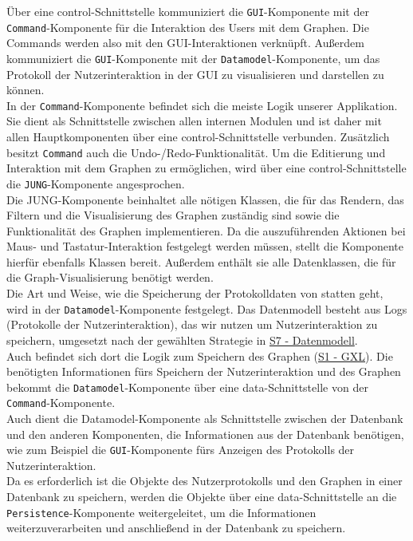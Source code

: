 \documentclass[enabledeprecatedfontcommands,fontsize=11pt,paper=a4,twoside]{scrartcl}
\newcounter{one}
\begin{document}
Über eine control-Schnittstelle kommuniziert die \texttt{GUI}-Komponente mit der \texttt{Command}-Komponente für die Interaktion des Users mit dem Graphen. Die Commands werden also mit den GUI-Interaktionen verknüpft.
Außerdem kommuniziert die \texttt{GUI}-Komponente mit der \texttt{Datamodel}-Komponente, um das Protokoll der Nutzerinteraktion in der GUI zu visualisieren und darstellen zu können. \\

In der \texttt{Command}-Komponente befindet sich die meiste Logik unserer Applikation. Sie dient als Schnittstelle zwischen allen internen Modulen und ist daher mit allen Hauptkomponenten über eine control-Schnittstelle verbunden. Zusätzlich besitzt \texttt{Command} auch die Undo-/Redo-Funktionalität. Um die Editierung und Interaktion mit dem Graphen zu ermöglichen, wird über eine control-Schnittstelle die \texttt{JUNG}-Komponente angesprochen. \\

Die {JUNG}-Komponente beinhaltet alle nötigen Klassen, die für das Rendern, das Filtern und die Visualisierung des Graphen zuständig sind sowie die Funktionalität des Graphen implementieren. Da die auszuführenden Aktionen bei Maus- und Tastatur-Interaktion festgelegt werden müssen, stellt die Komponente hierfür ebenfalls Klassen bereit. Außerdem enthält sie alle Datenklassen, die für die Graph-Visualisierung benötigt werden. \\

Die Art und Weise, wie die Speicherung der Protokolldaten von statten geht, wird in der \texttt{Datamodel}-Komponente festgelegt. Das Datenmodell besteht aus Logs (Protokolle der Nutzerinteraktion), das wir nutzen um Nutzerinteraktion zu speichern, umgesetzt nach der gewählten Strategie in \hyperlink{aaa}{S7 - Datenmodell}. \\
Auch befindet sich dort die Logik zum Speichern des Graphen (\hyperlink{yy}{S1 - GXL}). Die benötigten Informationen fürs Speichern der Nutzerinteraktion und des Graphen bekommt die \texttt{Datamodel}-Komponente über eine data-Schnittstelle von der \texttt{Command}-Komponente. \\
Auch dient die Datamodel-Komponente als Schnittstelle zwischen der Datenbank und den anderen Komponenten, die Informationen aus der Datenbank benötigen, wie zum Beispiel die \texttt{GUI}-Komponente fürs Anzeigen des Protokolls der Nutzerinteraktion.\\
Da es erforderlich ist die Objekte des Nutzerprotokolls und den Graphen in einer Datenbank zu speichern, werden die Objekte über eine data-Schnittstelle an die \texttt{Persistence}-Komponente weitergeleitet, um die Informationen weiterzuverarbeiten und anschließend in der Datenbank zu speichern. \\ 
\end{document}
